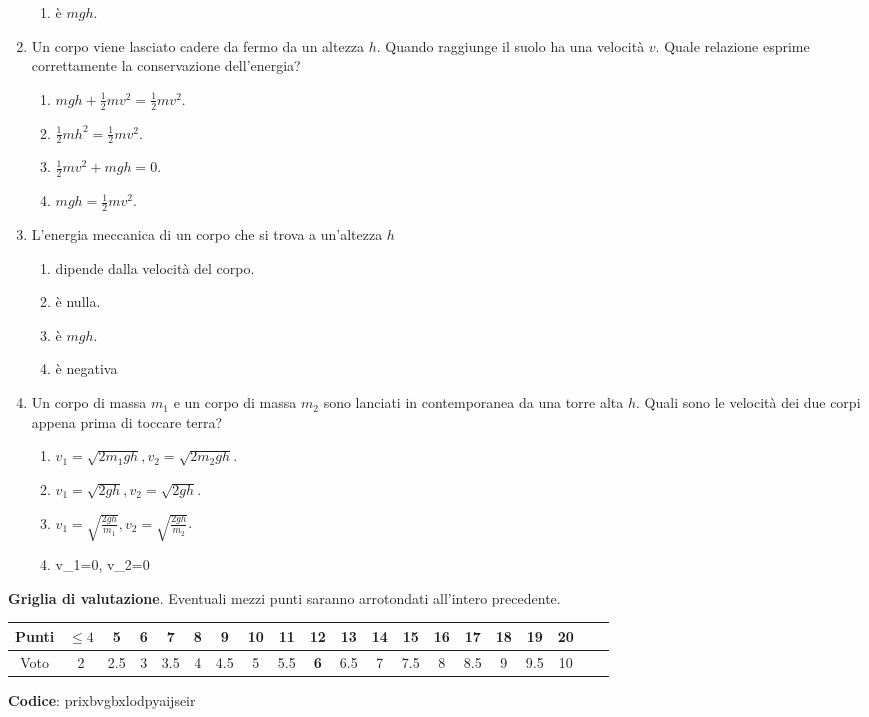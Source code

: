 \documentclass{article}
\begin{document}
\begin{enumerate}
\begin{enumerate}[label=\Alph*.]
    \item è $mgh$.
  \end{enumerate}
  \item Un corpo viene lasciato cadere da fermo da un altezza $h$. Quando raggiunge il suolo ha una velocità $v$. Quale relazione esprime correttamente la conservazione dell'energia?
  \begin{enumerate}[label=\Alph*.]
    \item $mgh+\frac{1}{2}mv^2=\frac{1}{2}mv^2.$
    \item $\frac{1}{2}mh^2=\frac{1}{2}mv^2$.
    \item $\frac{1}{2}mv^2+mgh=0.$
    \item $mgh=\frac{1}{2}mv^2$.
  \end{enumerate}
  \item L'energia meccanica di un corpo che si trova a un'altezza $h$
  \begin{enumerate}[label=\Alph*.]
    \item dipende dalla velocità del corpo.
    \item è nulla.
    \item è $mgh$.
    \item è negativa
  \end{enumerate}
  \item Un corpo di massa $m_1$ e un corpo di massa $m_2$ sono lanciati in contemporanea da una torre alta $h$. Quali sono le velocità dei due corpi appena prima di toccare terra?
  \begin{enumerate}[label=\Alph*.]
    \item $v_1=\sqrt{2m_1gh}, v_2=\sqrt{2m_2gh}$.
    \item $v_1=\sqrt{2gh}, v_2=\sqrt{2gh}$.
    \item $v_1=\sqrt{\frac{2gh}{m_1}}, v_2=\sqrt{\frac{2gh}{m_2}}$.
    \item v_1=0, v_2=0
  \end{enumerate}
\end{enumerate}








\newpage \maketitle \centering \textbf{Griglia di valutazione}. Eventuali mezzi punti saranno arrotondati all'intero precedente. \begin{table}[h]     \centering \begin{tabular}{|c|c|c|c|c|c|c|c|c|c|c|c|c|c|c|c|c|c|c|c|} \hline Punti &  $\leq 4$ & 5 & 6 & 7 & 8 & 9 & 10 & 11 & \textbf{12} & 13 & 14 & 15 & 16 & 17 & 18 & 19 & 20 \\ \hline Voto & 2 & 2.5 & 3 & 3.5 & 4 & 4.5 & 5 & 5.5 & \textbf{6} & 6.5 & 7 & 7.5 & 8 & 8.5 & 9 & 9.5 & 10 \\ \hline \end{tabular} \end{table}
\textbf{Codice}: prixbvgbxlodpyaijseir
\end{document}
